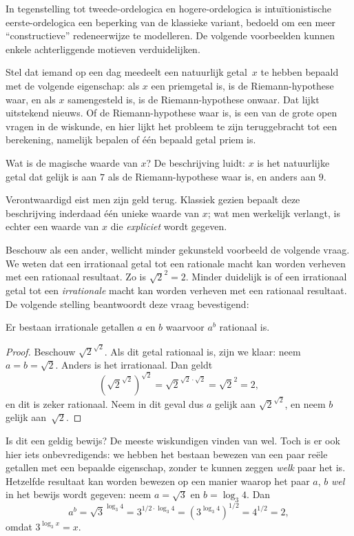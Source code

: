 \documentclass[../../../include/open-logic-section]{subfiles}
\begin{document}


In tegenstelling tot tweede-ordelogica en hogere-ordelogica is
intuïtionistische eerste-ordelogica een beperking van de klassieke variant,
bedoeld om een meer ``constructieve'' redeneerwijze te modelleren. De volgende
voorbeelden kunnen enkele achterliggende motieven verduidelijken.

Stel dat iemand op een dag meedeelt een natuurlijk getal~$x$ te hebben bepaald
met de volgende eigenschap: als $x$ een priemgetal is, is de Riemann-hypothese
waar, en als $x$ samengesteld is, is de Riemann-hypothese onwaar. Dat lijkt
uitstekend nieuws. Of de Riemann-hypothese waar is, is een van de grote open
vragen in de wiskunde, en hier lijkt het probleem te zijn teruggebracht tot een
berekening, namelijk bepalen of één bepaald getal priem is.

Wat is de magische waarde van $x$? De beschrijving luidt: $x$ is het natuurlijke
getal dat gelijk is aan $7$ als de Riemann-hypothese waar is, en anders aan $9$.

Verontwaardigd eist men zijn geld terug. Klassiek gezien bepaalt deze
beschrijving inderdaad één unieke waarde van $x$; wat men werkelijk verlangt,
is echter een waarde van $x$ die \emph{expliciet} wordt gegeven.

Beschouw als een ander, wellicht minder gekunsteld voorbeeld de volgende vraag.
We weten dat een irrationaal getal tot een rationale macht kan worden verheven
met een rationaal resultaat. Zo is $\sqrt{2}^2 = 2$. Minder duidelijk is of een
irrationaal getal tot een \emph{irrationale} macht kan worden verheven met een
rationaal resultaat. De volgende stelling beantwoordt deze vraag bevestigend:

\begin{thm}
Er bestaan irrationale getallen $a$ en $b$ waarvoor $a^b$ rationaal is.
\end{thm}

\begin{proof}
Beschouw $\sqrt{2}^{\sqrt{2}}$. Als dit getal rationaal is, zijn we klaar: neem
$a = b = \sqrt{2}$. Anders is het irrationaal. Dan geldt
\[
(\sqrt{2}^{\sqrt{2}})^{\sqrt{2}} = \sqrt{2}^{\sqrt{2} \cdot
  \sqrt{2}} = \sqrt{2}^2 = 2,
\]
en dit is zeker rationaal. Neem in dit geval dus $a$ gelijk aan
$\sqrt{2}^{\sqrt{2}}$, en neem $b$ gelijk aan~$\sqrt 2$.
\end{proof}

Is dit een geldig bewijs? De meeste wiskundigen vinden van wel. Toch is er ook
hier iets onbevredigends: we hebben het bestaan bewezen van een paar reële
getallen met een bepaalde eigenschap, zonder te kunnen zeggen \emph{welk} paar
het is. Hetzelfde resultaat kan worden bewezen op een manier waarop het paar
$a$, $b$ \emph{wel} in het bewijs wordt gegeven: neem $a = \sqrt{3}$ en
$b = \log_3 4$. Dan
\[
a^b = \sqrt{3}^{\log_3 4} = 3^{1/2 \cdot \log_3 4} = (3^{\log_3
  4})^{1/2} = 4^{1/2}= 2,
\]
omdat $3^{\log_3 x} = x$.
\end{document}
